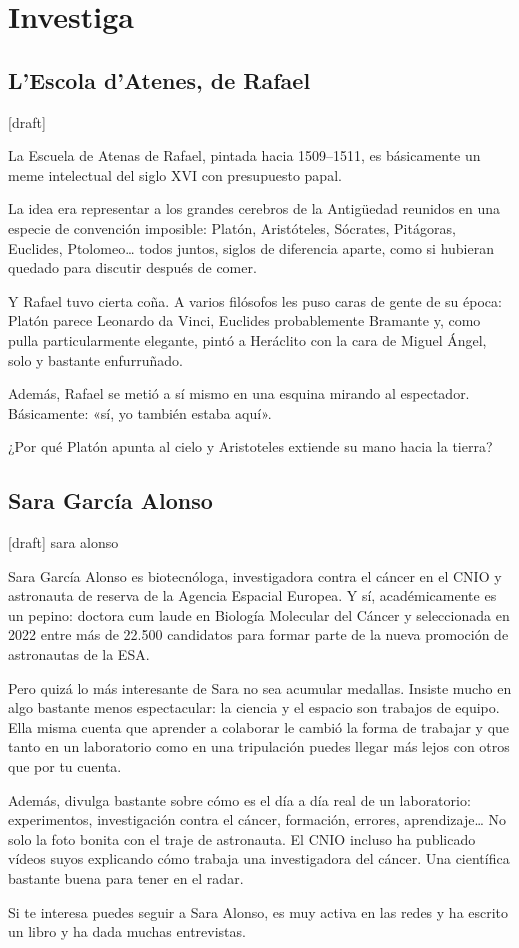 \section{Investiga}

\subsection{L'Escola d'Atenes, de Rafael}

[draft]

La Escuela de Atenas de Rafael, pintada hacia 1509–1511, es básicamente un meme intelectual del siglo XVI con presupuesto papal.

La idea era representar a los grandes cerebros de la Antigüedad reunidos en una especie de convención imposible: Platón, Aristóteles, Sócrates, Pitágoras, Euclides, Ptolomeo… todos juntos, siglos de diferencia aparte, como si hubieran quedado para discutir después de comer.

Y Rafael tuvo cierta coña. A varios filósofos les puso caras de gente de su época: Platón parece Leonardo da Vinci, Euclides probablemente Bramante y, como pulla particularmente elegante, pintó a Heráclito con la cara de Miguel Ángel, solo y bastante enfurruñado.

Además, Rafael se metió a sí mismo en una esquina mirando al espectador. Básicamente: «sí, yo también estaba aquí».

¿Por qué Platón apunta al cielo y Aristoteles extiende su mano hacia la tierra?

\subsection{Sara García Alonso}

[draft] sara alonso

Sara García Alonso es biotecnóloga, investigadora contra el cáncer en el CNIO y astronauta de reserva de la Agencia Espacial Europea. Y sí, académicamente es un pepino: doctora cum laude en Biología Molecular del Cáncer y seleccionada en 2022 entre más de 22.500 candidatos para formar parte de la nueva promoción de astronautas de la ESA.

Pero quizá lo más interesante de Sara no sea acumular medallas. Insiste mucho en algo bastante menos espectacular: la ciencia y el espacio son trabajos de equipo. Ella misma cuenta que aprender a colaborar le cambió la forma de trabajar y que tanto en un laboratorio como en una tripulación puedes llegar más lejos con otros que por tu cuenta.

Además, divulga bastante sobre cómo es el día a día real de un laboratorio: experimentos, investigación contra el cáncer, formación, errores, aprendizaje… No solo la foto bonita con el traje de astronauta. El CNIO incluso ha publicado vídeos suyos explicando cómo trabaja una investigadora del cáncer. Una científica bastante buena para tener en el radar.

Si te interesa puedes seguir a Sara Alonso, es muy activa en las redes y ha escrito un libro y ha dada muchas entrevistas.
